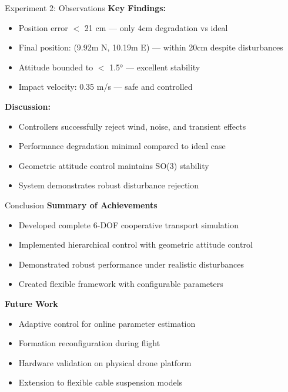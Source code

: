 \documentclass{beamer}
\begin{document}
\begin{frame}{Experiment 2: Observations}
\textbf{Key Findings:}
\begin{itemize}
    \item Position error $<$ 21 cm --- only 4cm degradation vs ideal
    \item Final position: (9.92m N, 10.19m E) --- within 20cm despite disturbances
    \item Attitude bounded to $<$ 1.5° --- excellent stability
    \item Impact velocity: 0.35 m/s --- safe and controlled
\end{itemize}

\vspace{0.5cm}
\textbf{Discussion:}
\begin{itemize}
    \item Controllers successfully reject wind, noise, and transient effects
    \item Performance degradation minimal compared to ideal case
    \item Geometric attitude control maintains SO(3) stability
    \item System demonstrates robust disturbance rejection
\end{itemize}
\end{frame}

\begin{frame}{Conclusion}
\textbf{Summary of Achievements}
\begin{itemize}
    \item Developed complete 6-DOF cooperative transport simulation
    \item Implemented hierarchical control with geometric attitude control
    \item Demonstrated robust performance under realistic disturbances
    \item Created flexible framework with configurable parameters
\end{itemize}

\vspace{0.5cm}
\textbf{Future Work}
\begin{itemize}
    \item Adaptive control for online parameter estimation
    \item Formation reconfiguration during flight
    \item Hardware validation on physical drone platform
    \item Extension to flexible cable suspension models
\end{itemize}
\end{frame}
\end{document}
